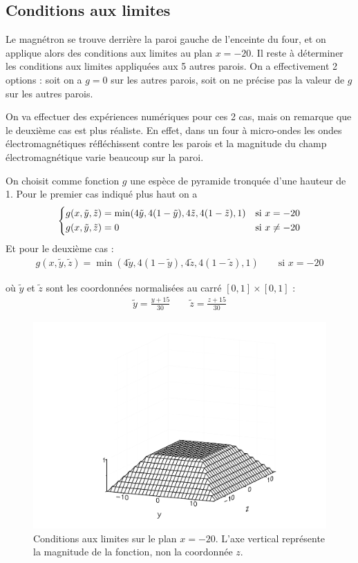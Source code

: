 
\subsection{Conditions aux limites}

Le magnétron se trouve derrière la paroi gauche de l'enceinte du four, et
on applique alors des conditions aux limites au plan $x = -20$. Il reste à
déterminer les conditions aux limites appliquées aux 5 autres parois. On a
effectivement 2 options : soit on a $g = 0$ sur les autres parois, soit on
ne précise pas la valeur de $g$ sur les autres parois.

On va effectuer des expériences numériques pour ces 2 cas, mais on remarque
que le deuxième cas est plus réaliste. En effet, dans un four à micro-ondes
les ondes électromagnétiques réfléchissent contre les parois et la magnitude
du champ électromagnétique varie beaucoup sur la paroi.

On choisit comme fonction $g$ une espèce de pyramide tronquée d'une
hauteur de 1. Pour le premier cas indiqué plus haut on a
\[\begin{dcases}
    g(x, \tilde{y}, \tilde{z})
    = \min(4\tilde{y}, 4(1-\tilde{y}), 4\tilde{z}, 4(1-\tilde{z}), 1)
    & \text{si } x = -20 \\
    g(x, \tilde{y}, \tilde{z}) = 0 & \text{si } x \neq -20
\end{dcases}\]
%
Et pour le deuxième cas :
\begin{align}
      g(x, \tilde{y}, \tilde{z})
      = \min(4\tilde{y}, 4(1-\tilde{y}), 4\tilde{z}, 4(1-\tilde{z}), 1)
      \qquad \text{si } x = -20
\end{align}

où $\tilde{y}$ et $\tilde{z}$ sont les coordonnées normalisées au carré
$[0,1] \times [0,1]$ :
\begin{align}
    \tilde{y} = \frac{y + 15}{30} \qquad \tilde{z} = \frac{z + 15}{30}
\end{align}

\begin{figure}[H]
    \centering
    \includegraphics[scale=0.5]{figures/helmholtz/conditions_limites.pdf}
    \caption{Conditions aux limites sur le plan $x = -20$. L'axe vertical
    représente la magnitude de la fonction, non la coordonnée $z$.}
\end{figure}

